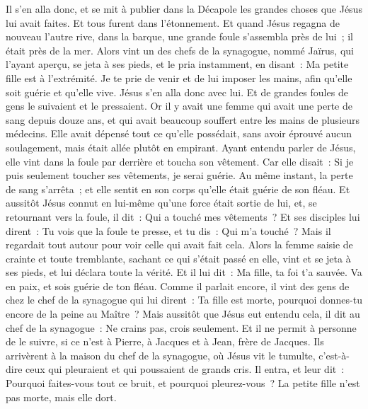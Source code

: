 \begin{multicols}{2}
Il s'en alla donc, et se mit à publier dans la Décapole les grandes choses que Jésus lui avait faites. Et tous furent dans l'étonnement.
Et quand Jésus regagna de nouveau l'autre rive, dans la barque, une grande foule s'assembla près de lui~; il était près de la mer.
Alors vint un des chefs de la synagogue, nommé Jaïrus, qui l'ayant aperçu, se jeta à ses pieds,
et le pria instamment, en disant~: Ma petite fille est à l'extrémité. Je te prie de venir et de lui imposer les mains, afin qu'elle soit guérie et qu'elle vive.
Jésus s'en alla donc avec lui. Et de grandes foules de gens le suivaient et le pressaient.
Or il y avait une femme qui avait une perte de sang depuis douze ans,
et qui avait beaucoup souffert entre les mains de plusieurs médecins. Elle avait dépensé tout ce qu'elle possédait, sans avoir éprouvé aucun soulagement, mais était allée plutôt en empirant.
Ayant entendu parler de Jésus, elle vint dans la foule par derrière et toucha son vêtement.
Car elle disait~: Si je puis seulement toucher ses vêtements, je serai guérie.
Au même instant, la perte de sang s'arrêta~; et elle sentit en son corps qu'elle était guérie de son fléau.
Et aussitôt Jésus connut en lui-même qu'une force était sortie de lui, et, se retournant vers la foule, il dit~: Qui a touché mes vêtements~?
Et ses disciples lui dirent~: Tu vois que la foule te presse, et tu dis~: Qui m'a touché~?
Mais il regardait tout autour pour voir celle qui avait fait cela.
Alors la femme saisie de crainte et toute tremblante, sachant ce qui s'était passé en elle, vint et se jeta à ses pieds, et lui déclara toute la vérité.
Et il lui dit~: Ma fille, ta foi t'a sauvée. Va en paix, et sois guérie de ton fléau.
Comme il parlait encore, il vint des gens de chez le chef de la synagogue qui lui dirent~: Ta fille est morte, pourquoi donnes-tu encore de la peine au Maître~?
Mais aussitôt que Jésus eut entendu cela, il dit au chef de la synagogue~: Ne crains pas, crois seulement.
Et il ne permit à personne de le suivre, si ce n'est à Pierre, à Jacques et à Jean, frère de Jacques.
Ils arrivèrent à la maison du chef de la synagogue, où Jésus vit le tumulte, c'est-à-dire ceux qui pleuraient et qui poussaient de grands cris.
Il entra, et leur dit~: Pourquoi faites-vous tout ce bruit, et pourquoi pleurez-vous~? La petite fille n'est pas morte, mais elle dort.

\end{multicols}
